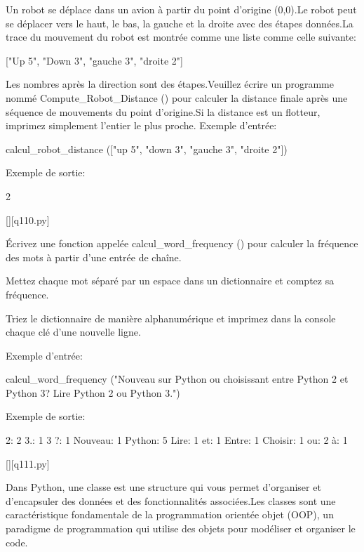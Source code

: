         \question
        Un robot se déplace dans un avion à partir du point d'origine (0,0).Le robot peut se déplacer vers le haut, le bas, la gauche et la droite avec des étapes données.La trace du mouvement du robot est montrée comme une liste comme celle suivante:

["Up 5", "Down 3", "gauche 3", "droite 2"]

Les nombres après la direction sont des étapes.Veuillez écrire un programme nommé Compute\_Robot\_Distance () pour calculer la distance finale après une séquence de mouvements du point d'origine.Si la distance est un flotteur, imprimez simplement l'entier le plus proche.
Exemple d'entrée:

calcul\_robot\_distance (["up 5", "down 3", "gauche 3", "droite 2"])

Exemple de sortie:

2
        \par
        \renewcommand{\nomfichier}{q110.py}
        \begin{solution}
            \pythonfile{\chemincode \nomfichier}[][\nomfichier]
        \end{solution}
        

        \question
        Écrivez une fonction appelée calcul\_word\_frequency () pour calculer la fréquence des mots à partir d'une entrée de chaîne.

Mettez chaque mot séparé par un espace dans un dictionnaire et comptez sa fréquence.

Triez le dictionnaire de manière alphanumérique et imprimez dans la console chaque clé d'une nouvelle ligne.

Exemple d'entrée:

calcul\_word\_frequency ("Nouveau sur Python ou choisissant entre Python 2 et Python 3? Lire Python 2 ou Python 3.")

Exemple de sortie:

2: 2
3.: 1
3 ?: 1
Nouveau: 1
Python: 5
Lire: 1
et: 1
Entre: 1
Choisir: 1
ou: 2
à: 1
        \par
        \renewcommand{\nomfichier}{q111.py}
        \begin{solution}
            \pythonfile{\chemincode \nomfichier}[][\nomfichier]
        \end{solution}
        

        \question
        Dans Python, une classe est une structure qui vous permet d'organiser et d'encapsuler des données et des fonctionnalités associées.Les classes sont une caractéristique fondamentale de la programmation orientée objet (OOP), un paradigme de programmation qui utilise des objets pour modéliser et organiser le code.

